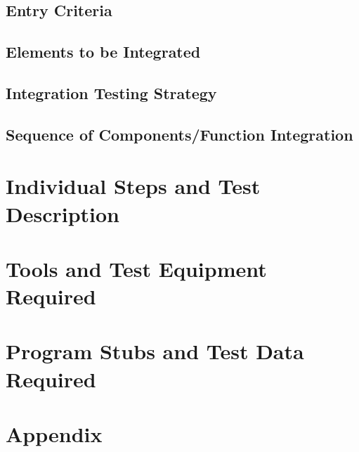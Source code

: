 \documentclass[a4paper,12pt]{report}
\begin{document}
\section{Entry Criteria}


\section{Elements to be Integrated} \label{elems_int}


\section{Integration Testing Strategy} \label{strategy}


\section{Sequence of Components/Function Integration}


\chapter{Individual Steps and Test Description}



\chapter{Tools and Test Equipment Required}


\chapter{Program Stubs and Test Data Required}


\appendix
\chapter{Appendix}



\end{document}
